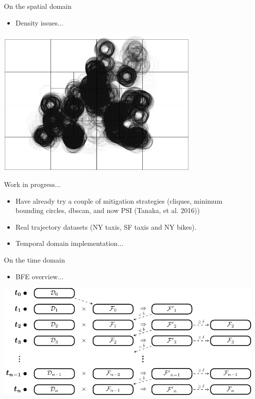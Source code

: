 \documentclass{beamer}
\begin{document}
    \begin{frame}{On the spatial domain}
        \begin{itemize} \item Density issues... \end{itemize} \vspace{0.5cm}

        \centering
        \includegraphics[width=0.75\textwidth]{figures/candidates.png}
    \end{frame}

    \begin{frame}{Work in progress...}
        \begin{itemize}
        \item Have already try a couple of mitigation strategies (cliques, minimum bounding circles, dbscan, and now PSI (Tanaka, et al. 2016))
        \item Real trajectory datasets (NY taxis, SF taxis and NY bikes).
        \item Temporal domain implementation...
        \end{itemize}

    \end{frame}

    \begin{frame}{On the time domain}
        \begin{itemize} \item BFE overview... \end{itemize} \vspace{0.5cm}

        \centering
        \includegraphics[height=0.55\textheight]{figures/FF_stages}
    \end{frame}
\end{document}
